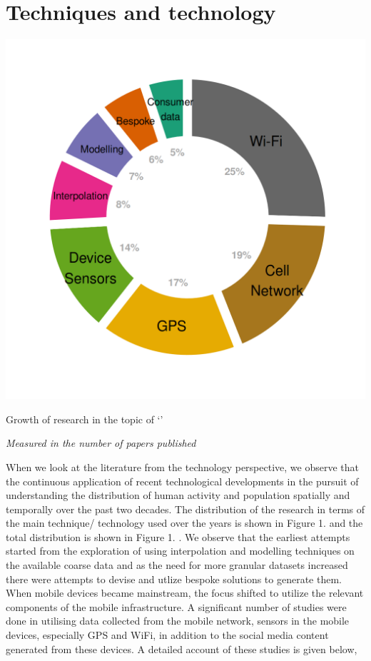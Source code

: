 \section{Techniques and technology}

\begin{marginfigure}
  \includegraphics[trim={1.1cm 1cm 1cm 1cm},clip]{images/literature-technology.png}
  \caption{Growth of research in the topic of `'}
  \label{figure:literature:timeline}
  \noindent\fontsize{7}{7}\textit{Measured in the number of papers published}
\end{marginfigure}

When we look at the literature from the technology perspective, we observe that the continuous application of recent technological developments in the pursuit of understanding the distribution of human activity and population spatially and temporally over the past two decades.
The distribution of the research in terms of the main technique/ technology used over the years is shown in Figure 1.
 and the total distribution is shown in Figure 1.
. We observe that the earliest attempts started from the exploration of using interpolation and modelling techniques on the available coarse data and as the need for more granular datasets increased there were attempts to devise and utlize bespoke solutions to generate them.
When mobile devices became mainstream, the focus shifted to utilize the relevant components of the mobile infrastructure.
A significant number of studies were done in utilising data collected from the mobile network, sensors in the mobile devices, especially GPS and WiFi, in addition to the social media content generated from these devices.
A detailed account of these studies is given below,

